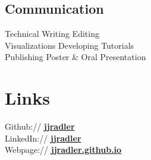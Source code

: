 \documentclass[letterpaper]{deedy-resume} %
\begin{document}
\begin{minipage}[t]{0.32\textwidth}
\subsection{Communication}
\sectionspace
Technical Writing \textbullet{} Editing\\
Visualizations \textbullet{} Developing Tutorials\\
Publishing \textbullet{} Poster \& Oral Presentation

\sectionspace

\section{Links} 
Github:// \href{https://github.com/jjradler}{\bf jjradler} \\
LinkedIn:// \href{https://www.linkedin.com/in/jjradler/}{\bf jjradler} \\
Webpage:// \href{http://jjradler.github.io}{\bf jjradler.github.io}

\end{minipage} %
\vspace{0pt}
\end{document}
